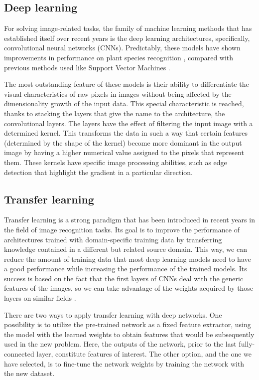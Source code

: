 \documentclass{article}
\begin{document}
\subsection{Deep learning}
For solving image-related tasks, the family of machine learning methods that has established itself over recent years is the deep learning architectures,  specifically, convolutional neural networks (CNNs). Predictably, these models have shown improvements in performance on plant species recognition \cite{CNNLifeCLEF} \cite{CNNSDM} \cite{CNNMEE}, compared with previous methods used like Support Vector Machines \cite{svm}. 

The most outstanding feature of these models is their ability to differentiate the visual characteristics of raw pixels in images without being affected by the dimensionality growth of the input data. This special characteristic is reached, thanks to stacking the layers that give the name to the architecture, the convolutional layers. The layers have the effect of filtering the input image with a determined kernel. This transforms the data in such a way that certain features (determined by the shape of the kernel) become more dominant in the output image by having a higher numerical value assigned to the pixels that represent them. These kernels have specific image processing abilities, such as edge detection that highlight the gradient in a particular direction.

\subsection{Transfer learning}
Transfer learning is a strong paradigm that has been introduced in recent years in the field of image recognition tasks. Its goal is to improve the performance of architectures trained with domain-specific training data by transferring knowledge contained in a different but related source domain. This way, we can reduce the amount of training data that most deep learning models need to have a good performance while increasing the performance of the trained models. Its success is based on the fact that the first layers of CNNs deal with the generic features of the images, so we can take advantage of the weights acquired by those layers on similar fields \cite{transferlearning}.

There are two ways to apply transfer learning with deep networks. One possibility is to utilize the pre-trained network as a fixed feature extractor, using the model with the learned weights to obtain features that would be subsequently used in the new problem. Here, the outputs of the network, prior to the last fully-connected layer, constitute features of interest. The other option, and the one we have selected, is to fine-tune the network weights by training the network with the new dataset. \cite{planttransferlearning}
\end{document}
